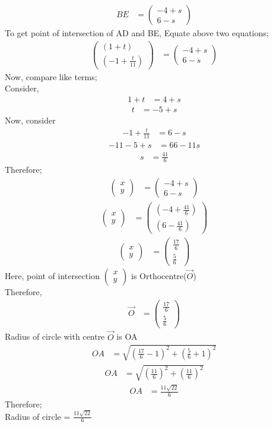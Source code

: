 \documentclass[journal,12pt,onecolumn]{IEEEtran}
\newcommand{\myvec}[1]{\ensuremath{\begin{pmatrix}#1\end{pmatrix}}}
\begin{document}
\begin{align}
       BE &= \myvec{-4+s\\6-s}
\end{align}
To get point of intersection of AD and BE, Equate above two equations;
\begin{align}
       \myvec{\left(1+t\right)\\\left(-1+\frac{t}{11}\right)} &= \myvec{-4+s\\6-s}
\end{align}
Now, compare like terms;\\
Consider,
\begin{align}
       1+t &= 4+s
\end{align}
\begin{align}
       t &= -5+s
\end{align}
Now, consider
\begin{align}
       -1+\frac{t}{11} &= 6-s
\end{align}
\begin{align}
       -11-5+s &= 66-11s
\end{align}
\begin{align}
        s &= \frac{41}{6}
\end{align}
Therefore;
\begin{align}
        \myvec{x\\y} &= \myvec{-4+s\\6-s}
\end{align}
\begin{align}
        \myvec{x\\y} &= \myvec{\left(-4+\frac{41}{6}\right)\\\left(6-\frac{41}{6}\right)}
\end{align}
\begin{align}
        \myvec{x\\y} &= \myvec{\frac{17}{6}\\\frac{5}{6}}
\end{align}
Here, point of intersection \myvec{x\\y} is Orthocentre($\vec{O}$)\\
Therefore,\\
\begin{align}
        \vec{O} &= \myvec{\frac{17}{6}\\\frac{5}{6}}
\end{align}
Radius of circle with centre $\vec{O}$ is OA
\begin{align}
             OA &= \sqrt{\left(\frac{17}{6} - 1 \right)^2 + \left(\frac{5}{6} + 1 \right)^2}
\end{align}
\begin{align}
             OA &= \sqrt{(\frac{11}{6})^2 + (\frac{11}{6})^2}
\end{align}
\begin{align}
             OA &= \frac{11\sqrt{22}}{6}
\end{align}
Therefore;\\
Radius of circle = $\frac{11\sqrt{22}}{6}$\\
\end{document}
